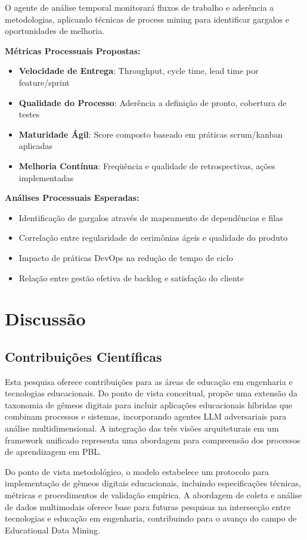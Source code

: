 \documentclass[english, spanish, brazilian]{modelo_dt}
\begin{document}
O agente de análise temporal monitorará fluxos de trabalho e aderência a metodologias, aplicando técnicas de process mining para identificar gargalos e oportunidades de melhoria.

\textbf{Métricas Processuais Propostas:}
\begin{itemize}
\item \textbf{Velocidade de Entrega}: Throughput, cycle time, lead time por feature/sprint
\item \textbf{Qualidade do Processo}: Aderência a definição de pronto, cobertura de testes
\item \textbf{Maturidade Ágil}: Score composto baseado em práticas scrum/kanban aplicadas
\item \textbf{Melhoria Contínua}: Freqüência e qualidade de retrospectivas, ações implementadas
\end{itemize}

\textbf{Análises Processuais Esperadas:}
\begin{itemize}
\item Identificação de gargalos através de mapeamento de dependências e filas
\item Correlação entre regularidade de cerimônias ágeis e qualidade do produto
\item Impacto de práticas DevOps na redução de tempo de ciclo
\item Relação entre gestão efetiva de backlog e satisfação do cliente
\end{itemize}

\section{Discussão}

\subsection{Contribuições Científicas}

Esta pesquisa oferece contribuições para as áreas de educação em engenharia e tecnologias educacionais\@. Do ponto de vista conceitual, propõe uma extensão da taxonomia de gêmeos digitais para incluir aplicações educacionais híbridas que combinam processos e sistemas, incorporando agentes LLM adversariais para análise multidimensional\@. A integração das três visões arquiteturais em um framework unificado representa uma abordagem para compreensão dos processos de aprendizagem em PBL\@.

Do ponto de vista metodológico, o modelo estabelece um protocolo para implementação de gêmeos digitais educacionais, incluindo especificações técnicas, métricas e procedimentos de validação empírica\@. A abordagem de coleta e análise de dados multimodais oferece base para futuras pesquisas na intersecção entre tecnologias e educação em engenharia, contribuindo para o avanço do campo de Educational Data Mining\@.
\end{document}
